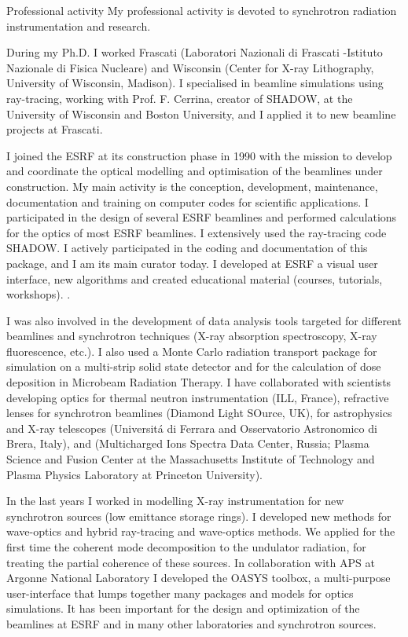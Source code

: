 \begin{rubric}{Professional activity}
My professional activity is devoted to synchrotron radiation
instrumentation and research.

During my Ph.D. I worked  Frascati (Laboratori Nazionali di Frascati -Istituto Nazionale di Fisica Nucleare) and Wisconsin
(Center for X-ray Lithography, University of Wisconsin, Madison). I specialised in beamline simulations using ray-tracing, working with Prof. F. Cerrina, creator of SHADOW, at the University of Wisconsin and Boston University, and I applied it to new beamline projects at Frascati. 

I joined the ESRF at its construction phase in 1990 with the mission to develop and coordinate the optical modelling and optimisation of the beamlines under construction.
My main activity is the conception, development, maintenance, documentation and training on
computer codes for scientific applications. I participated in the design of several ESRF beamlines and performed calculations for the optics of most ESRF beamlines.
I extensively used the ray-tracing code SHADOW. I actively participated in the coding and
documentation of this package, and I am its main curator today. I developed at ESRF a visual user interface, new algorithms and
created educational material (courses, tutorials, workshops). .

I was also involved in the development of data analysis tools targeted for different beamlines and
synchrotron techniques (X-ray absorption spectroscopy, X-ray fluorescence, etc.). I also used a
Monte Carlo radiation transport package for simulation on a multi-strip solid state detector and for
the calculation of dose deposition in Microbeam Radiation Therapy.
I have collaborated with scientists developing  optics for thermal neutron instrumentation (ILL, France), refractive lenses for synchrotron beamlines (Diamond Light SOurce, UK),  for
astrophysics and X-ray telescopes (Universit\'a di Ferrara and Osservatorio Astronomico di Brera, Italy), and 
(Multicharged Ions Spectra Data Center, Russia; Plasma Science and Fusion Center at the Massachusetts Institute of Technology and Plasma Physics Laboratory at Princeton University). 

In the last years I worked in modelling X-ray instrumentation for new synchrotron sources (low emittance storage rings). I developed new methods for wave-optics and hybrid ray-tracing and wave-optics methods. We applied for the first time the coherent mode decomposition to the undulator radiation, for treating the partial coherence of these sources. In collaboration with APS at Argonne National Laboratory I developed the OASYS toolbox, a multi-purpose user-interface that lumps together many packages and models for optics simulations. It has been important for the design and optimization of the beamlines at ESRF and in many other laboratories and synchrotron sources.


\end{rubric}
